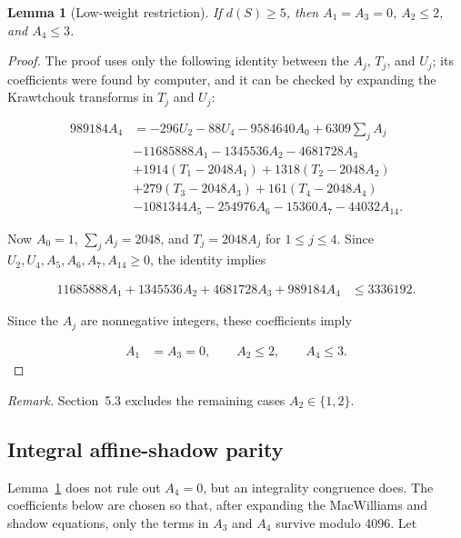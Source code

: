 \documentclass[11pt]{article}
\newtheorem{lemma}[theorem]{Lemma}
\begin{document}
\begin{lemma}[Low-weight restriction]\label{lem:low-weight}
If \(d(S)\geq5\), then \(A_1=A_3=0\), \(A_2\leq2\), and \(A_4\leq3\).
\end{lemma}
\begin{proof}
The proof uses only the following identity between the \(A_j\), \(T_j\), and \(U_j\); its coefficients were found by computer, and it can be checked by expanding the Krawtchouk transforms in \(T_{j}\) and \(U_{j}\):

\[
\begin{aligned}
989184 A_{4} &=-296 U_{2} -88 U_{4} -9584640 A_{0} +6309 \sum_{j} A_{j} \\
& -11685888 A_{1} -1345536 A_{2} -4681728 A_{3} \\
& +1914 (T_{1}-2048 A_{1}) +1318 (T_{2}-2048 A_{2}) \\
& +279 (T_{3}-2048 A_{3}) +161 (T_{4}-2048 A_{4}) \\
& -1081344 A_{5} -254976 A_{6} -15360 A_{7} -44032 A_{14}.
\end{aligned}
\]

Now \(A_0=1\), \(\sum_j A_j=2048\), and \(T_j=2048A_j\) for \(1\leq j\leq4\). Since \(U_2,U_4,A_5,A_6,A_7,A_{14}\geq0\), the identity implies

\[
\begin{aligned}
11685888 A_{1} +1345536 A_{2} +4681728 A_{3} +989184 A_{4} &\leq 3336192.
\end{aligned}
\]

Since the \(A_j\) are nonnegative integers, these coefficients imply

\[
\begin{aligned}
A_{1} &=A_{3} = 0,\qquad A_{2} \leq 2,\qquad A_{4} \leq 3.
\end{aligned}
\]
\end{proof}

\noindent\emph{Remark.} Section~5.3 excludes the remaining cases \(A_{2}\in\{1,2\}\).

\subsection{Integral affine-shadow parity}\label{integral-affine-shadow-parity}

Lemma~\ref{lem:low-weight} does not rule out \(A_{4}=0\), but an integrality congruence does. The coefficients below are chosen so that, after expanding the MacWilliams and shadow equations, only the terms in \(A_{3}\) and \(A_{4}\) survive modulo 4096. Let
\end{document}
